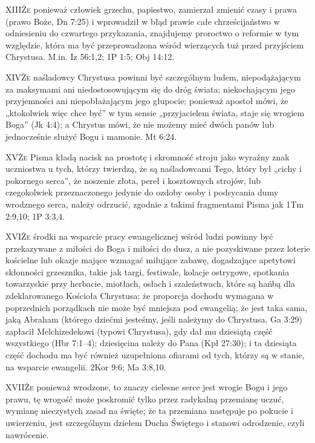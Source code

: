\lettrine{XIII}{Że} ponieważ człowiek grzechu, papiestwo, zamierzał zmienić czasy i prawa (prawo Boże, Dn 7:25) i wprowadził w błąd prawie całe chrześcijaństwo w odniesieniu do czwartego przykazania, znajdujemy proroctwo o reformie w tym względzie, która ma być przeprowadzona wśród wierzących tuż przed przyjściem Chrystusa. M.in. Iz 56:1,2; 1P 1:5; Obj 14:12.

\lettrine{XIV}{Że} naśladowcy Chrystusa powinni być szczególnym ludem, niepodążającym za maksymami ani niedostosowującym się do dróg świata; niekochającym jego przyjemności ani niepobłażającym jego głupocie; ponieważ apostoł mówi, że „ktokolwiek więc chce być” w tym sensie „przyjacielem świata, staje się wrogiem Boga” (Jk 4:4); a Chrystus mówi, że nie możemy mieć dwóch panów lub jednocześnie służyć Bogu i mamonie. Mt 6:24.

\lettrine{XV}{Że} Pisma kładą nacisk na prostotę i skromność stroju jako wyraźny znak uczniostwa u tych, którzy twierdzą, że są naśladowcami Tego, który był „cichy i pokornego serca”, że noszenie złota, pereł i kosztownych strojów, lub czegokolwiek przeznaczonego jedynie do ozdoby osoby i podsycania dumy wrodznego serca, należy odrzucić, zgodnie z takimi fragmentami Pisma jak 1Tm 2:9,10; 1P 3:3,4.

\lettrine{XVI}{Że} środki na wsparcie pracy ewangelicznej wśród ludzi powinny być przekazywane z miłości do Boga i miłości do dusz, a nie pozyskiwane przez loterie kościelne lub okazje mające wzmagać miłujące zabawę, dogadzające apetytowi skłonności grzesznika, takie jak targi, festiwale, kolacje ostrygowe, spotkania towarzyskie przy herbacie, miotłach, osłach i szaleństwach, które są hańbą dla zdeklarowanego Kościoła Chrystusa; że proporcja dochodu wymagana w poprzednich porządkach nie może być mniejsza pod ewangelią; że jest taka sama, jaką Abraham (którego dziećmi jesteśmy, jeśli należymy do Chrystusa, Ga 3:29) zapłacił Melchizedekowi (typowi Chrystusa), gdy dał mu dziesiątą część wszystkiego (Hbr 7:1--4); dziesięcina należy do Pana (Kpł 27:30); i ta dziesiąta część dochodu ma być również uzupełniona ofiarami od tych, którzy są w stanie, na wsparcie ewangelii. 2Kor 9:6; Ma 3:8,10.

\lettrine{XVII}{Że} ponieważ wrodzone, to znaczy cielesne serce jest wrogie Bogu i jego prawu, tę wrogość może poskromić tylko przez radykalną przemianę uczuć, wymianę nieczystych zasad na święte; że ta przemiana następuje po pokucie i uwierzeniu, jest szczególnym dziełem Ducha Świętego i stanowi odrodzenie, czyli nawrócenie.

